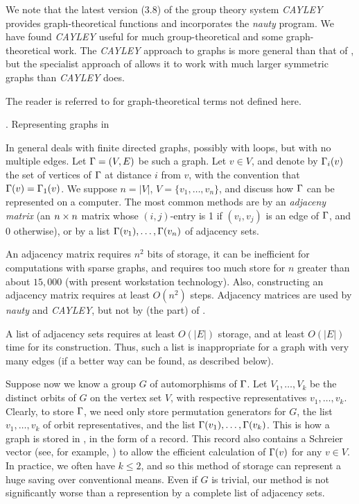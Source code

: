 We note that the latest version (3.8) of the group theory system {\it CAYLEY} 
\cite{3} provides graph-theoretical functions and incorporates
the {\it nauty} program. We have found {\it CAYLEY} useful for much
group-theoretical and some graph-theoretical work.
The {\it CAYLEY} approach to graphs is more general than that of 
{\GRAPE}, but the specialist approach of {\GRAPE} allows 
it to work with much larger symmetric graphs than {\it CAYLEY} does.

The reader is referred to \cite{2} for graph-theoretical 
terms not defined here.

. Representing graphs in {\GRAPE}                %
\endhead                             %

In general {\GRAPE} deals with finite directed graphs,
possibly with loops, but with no multiple edges.
Let $\Gamma=(V,E)$ be such a graph.  Let $v\in V$, and denote by  
$\Gamma_i(v)$ the set of vertices of $\Gamma$ at distance 
$i$ from $v$, with the convention that $\Gamma(v)=\Gamma_1(v)$.
We suppose $n=|V|$, $V=\{v_1,\ldots,v_n\}$, and
discuss how $\Gamma$ can be represented on a computer. 
The most common methods are by an {\it adjaceny matrix} 
(an $n\times n$ matrix whose $(i,j)$-entry is 1 if $(v_i,v_j)$
is an edge of $\Gamma$, and 0 otherwise), 
or by a list $\Gamma(v_1),\ldots,\Gamma(v_n)$ of adjacency sets. 

An adjacency matrix requires $n^2$ bits of storage, 
it can be inefficient for computations with sparse graphs, 
and requires too much store for $n$ greater than about $15,000$
(with present workstation technology).
Also, constructing an adjacency matrix requires at least $O(n^2)$ steps.
Adjacency matrices are used by {\it nauty} and {\it CAYLEY},
but not by (the {\GAP} part) of {\GRAPE}.

A list of adjacency sets requires at least $O(|E|)$ storage, 
and at least $O(|E|)$  
time for its construction. Thus, such a list is inappropriate for 
a graph with very many edges (if a better way can be found, as
described below).

Suppose now we know a group $G$ of automorphisms of $\Gamma$.
Let $V_1,\ldots,V_k$ be the distinct orbits
of $G$ on the vertex set $V$, with respective representatives 
$v_1,\ldots,v_k$. Clearly, to store $\Gamma$, we need only store
permutation generators for $G$, the list
$v_1,\ldots,v_k$ of orbit representatives, 
and the list $\Gamma(v_1),\ldots,\Gamma(v_k)$. 
This is how a graph is stored in {\GRAPE}, in the form 
of a {\GAP} record. This record also contains a 
Schreier vector (see, for example, \cite{7}) to allow the efficient
calculation of $\Gamma(v)$ for any $v\in V$. 
In practice, we often have $k\le2$, and so this method of
storage can represent a huge saving over conventional 
means. Even if $G$ is trivial, our method is not 
significantly worse than a represention by a complete list of adjacency sets. 

